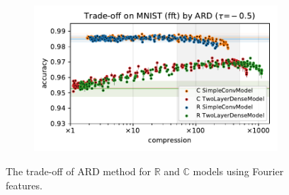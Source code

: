 \documentclass[a4paper,10pt,twocolumn]{article}
\newcommand{\real}{\mathbb{R}}
\newcommand{\cplx}{\mathbb{C}}
\begin{document}
\begin{figure}[b]
\begin{subfigure}[b]{0.5\columnwidth}
  \end{subfigure}%
  \begin{subfigure}[b]{0.5\columnwidth}
    \centering
    \includegraphics[width=\linewidth]{figure__mnist-like__trade-off/appendix__ARD__mnist__fft__-0.5.pdf}
  \end{subfigure}
  \caption{%
    The trade-off of ARD method for $\real$ and $\cplx$ models using Fourier features.
  }
  \label{fig:appendix__mnist-like__trade-off__ARD__fft}
\end{figure}
\end{document}
